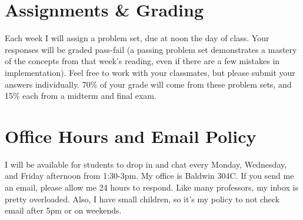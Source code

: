 \documentclass[11pt, letterpaper]{article}
\begin{document}
%
%
%
%

\section*{Assignments \& Grading}

Each week I will assign a problem set, due at noon the day of class. Your responses will be graded pass-fail (a passing problem set demonstrates a mastery of the concepts from that week's reading, even if there are a few mistakes in implementation). Feel free to work with your classmates, but please submit your answers individually. 70\% of your grade will come from these problem sets, and 15\% each from a midterm and final exam.

\section*{Office Hours and Email Policy}
I will be available for students to drop in and chat every Monday, Wednesday, and Friday afternoon from 1:30-3pm. My office is Baldwin 304C. If you send me an email, please allow me 24 hours to respond. Like many professors, my inbox is pretty overloaded. Also, I have small children, so it's my policy to not check email after 5pm or on weekends.
\end{document}
